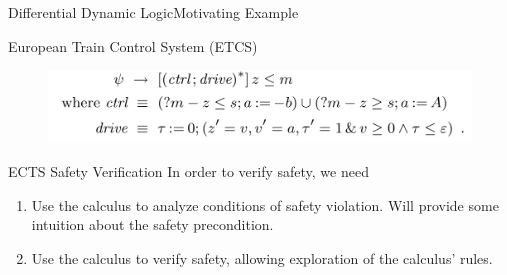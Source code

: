 \documentclass{beamer}
\begin{document}
\begin{frame}{Differential Dynamic Logic}{Motivating Example}
  \begin{block}{European Train Control System (ETCS)}
    \begin{figure}
      \includegraphics[scale=0.4]{ects-safety}
    \end{figure}
  \end{block}
  \begin{block}{ECTS Safety Verification}
    In order to verify safety, we need
    \begin{enumerate}
      \item Use the calculus to analyze conditions of safety violation. Will
        provide some intuition about the safety precondition.
      \item Use the calculus to verify safety, allowing exploration of the
        calculus' rules.
      \end{enumerate}
  \end{block}
\end{frame}
\end{document}
